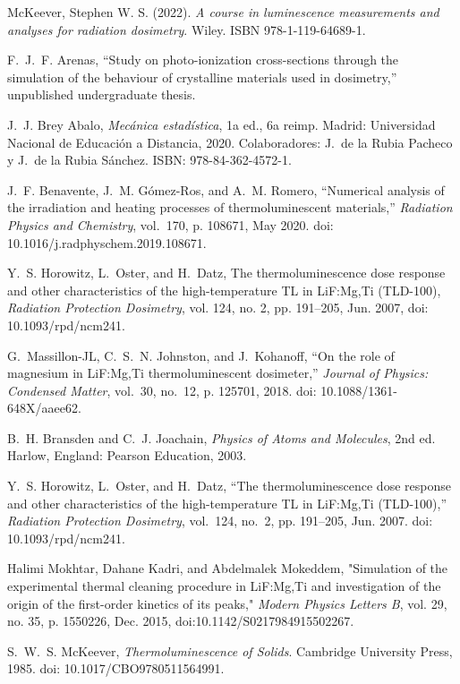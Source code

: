 
\begin{thebibliography}{999}

McKeever, Stephen W. S. (2022). \textit{A course in luminescence measurements and analyses for radiation dosimetry}. Wiley. ISBN 978-1-119-64689-1.

F.~J.~F. Arenas, ``Study on photo-ionization cross-sections through the simulation of the behaviour of crystalline materials used in dosimetry,'' unpublished undergraduate thesis.


J.~J. Brey Abalo, \emph{Mecánica estadística}, 1a ed., 6a reimp. Madrid: Universidad Nacional de Educación a Distancia, 2020. 
Colaboradores: J.~de la Rubia Pacheco y J.~de la Rubia Sánchez. 
ISBN: 978-84-362-4572-1. 

J.~F. Benavente, J.~M. Gómez-Ros, and A.~M. Romero, ``Numerical analysis of the irradiation and heating processes of thermoluminescent materials,'' \textit{Radiation Physics and Chemistry}, vol.~170, p. 108671, May 2020. doi: 10.1016/j.radphyschem.2019.108671.


 Y.~S. Horowitz, L.~Oster, and H.~Datz, The thermoluminescence dose response and other characteristics of the high-temperature TL in LiF:Mg,Ti (TLD-100), \textit{Radiation Protection Dosimetry}, vol. 124, no. 2, pp. 191--205, Jun. 2007, doi: 10.1093/rpd/ncm241.

G.~Massillon-JL, C.~S.~N. Johnston, and J.~Kohanoff, ``On the role of magnesium in {LiF}:{Mg},{Ti} thermoluminescent dosimeter,'' \emph{Journal of Physics: Condensed Matter}, vol.~30, no.~12, p. 125701, 2018. doi: 10.1088/1361-648X/aaee62.

B.~H. Bransden and C.~J. Joachain, \emph{Physics of Atoms and Molecules}, 2nd ed. Harlow, England: Pearson Education, 2003.

Y.~S. Horowitz, L.~Oster, and H.~Datz, ``The thermoluminescence dose response and other characteristics of the high-temperature {TL} in {LiF}:{Mg},{Ti} ({TLD}-100),'' \emph{Radiation Protection Dosimetry}, vol.~124, no.~2, pp. 191--205, Jun. 2007. doi: 10.1093/rpd/ncm241.

Halimi Mokhtar, Dahane Kadri, and Abdelmalek Mokeddem,
"Simulation of the experimental thermal cleaning procedure in LiF:Mg,Ti and investigation of the origin of the first-order kinetics of its peaks,"
\textit{Modern Physics Letters B}, vol. 29, no. 35, p. 1550226, Dec. 2015, doi:10.1142/S0217984915502267.

S.~W.~S. McKeever, \emph{Thermoluminescence of Solids}. Cambridge University Press, 1985. doi: 10.1017/CBO9780511564991.



\end{thebibliography}